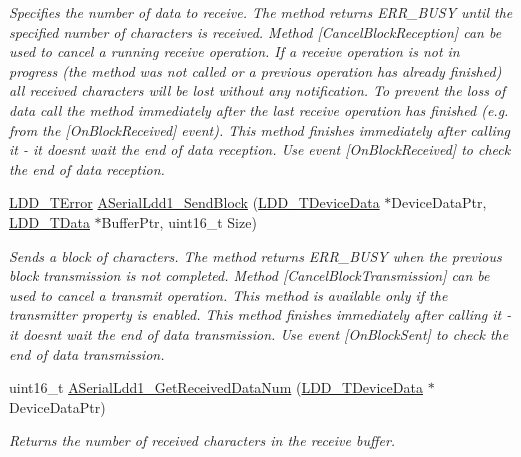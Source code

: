 \begin{DoxyCompactItemize}
\begin{DoxyCompactList}\small\item\em Specifies the number of data to receive. The method returns E\+R\+R\+\_\+\+B\+U\+SY until the specified number of characters is received. Method \mbox{[}Cancel\+Block\+Reception\mbox{]} can be used to cancel a running receive operation. If a receive operation is not in progress (the method was not called or a previous operation has already finished) all received characters will be lost without any notification. To prevent the loss of data call the method immediately after the last receive operation has finished (e.\+g. from the \mbox{[}On\+Block\+Received\mbox{]} event). This method finishes immediately after calling it -\/ it doesn\textquotesingle{}t wait the end of data reception. Use event \mbox{[}On\+Block\+Received\mbox{]} to check the end of data reception. \end{DoxyCompactList}\item 
\hyperlink{group___p_e___types__module_ga24c2b045fd04e79e85f261ce4df35588}{L\+D\+D\+\_\+\+T\+Error} \hyperlink{group___a_serial_ldd1__module_gad73f06e0eda26a76d0ec611a50e16b1d}{A\+Serial\+Ldd1\+\_\+\+Send\+Block} (\hyperlink{group___p_e___types__module_gac5cf1362f1f0e3a2ce71b1bf2276d091}{L\+D\+D\+\_\+\+T\+Device\+Data} $\ast$Device\+Data\+Ptr, \hyperlink{group___p_e___types__module_gade8ef9401405bd941b6da738b807f980}{L\+D\+D\+\_\+\+T\+Data} $\ast$Buffer\+Ptr, uint16\+\_\+t Size)
\begin{DoxyCompactList}\small\item\em Sends a block of characters. The method returns E\+R\+R\+\_\+\+B\+U\+SY when the previous block transmission is not completed. Method \mbox{[}Cancel\+Block\+Transmission\mbox{]} can be used to cancel a transmit operation. This method is available only if the transmitter property is enabled. This method finishes immediately after calling it -\/ it doesn\textquotesingle{}t wait the end of data transmission. Use event \mbox{[}On\+Block\+Sent\mbox{]} to check the end of data transmission. \end{DoxyCompactList}\item 
uint16\+\_\+t \hyperlink{group___a_serial_ldd1__module_gaefdaaf46adfba5a4726e79fa086dac0b}{A\+Serial\+Ldd1\+\_\+\+Get\+Received\+Data\+Num} (\hyperlink{group___p_e___types__module_gac5cf1362f1f0e3a2ce71b1bf2276d091}{L\+D\+D\+\_\+\+T\+Device\+Data} $\ast$Device\+Data\+Ptr)
\begin{DoxyCompactList}\small\item\em Returns the number of received characters in the receive buffer. \end{DoxyCompactList}\item 

\end{DoxyCompactItemize}
